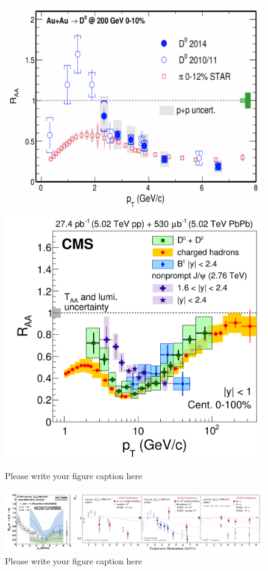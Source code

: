 \documentclass{webofc}
\begin{document}
\begin{figure}[ht]
\centering
\includegraphics[width=.45\textwidth]{Plots/DRAASTARAuAu}
\includegraphics[width=.45\textwidth]{Plots/DBNonPromptRAACMS}
\caption{Please write your figure caption here}
\label{FlavourRAA}     
\end{figure}

\begin{figure}[ht]
\centering
\includegraphics[width=.95\textwidth]{Plots/BPHENIXAuAu}
\caption{Please write your figure caption here}
\label{FlavourRAAPHENIX}
\end{figure}
\end{document}
